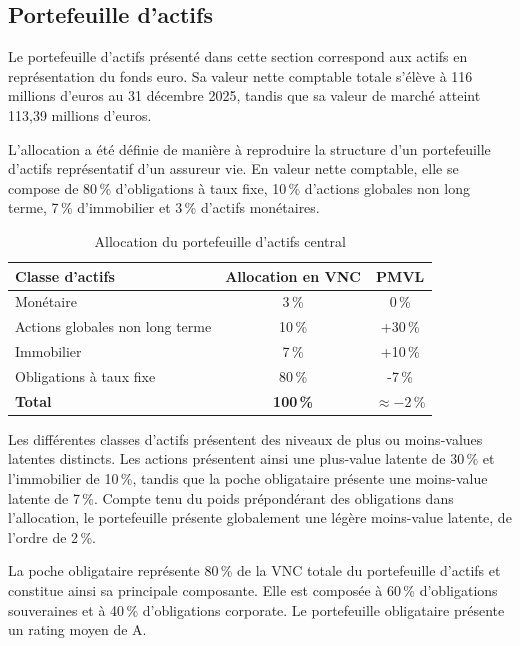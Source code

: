 \subsection{Portefeuille d'actifs}

Le portefeuille d'actifs présenté dans cette section correspond aux actifs en représentation du fonds euro. Sa valeur nette comptable totale s'élève à 116 millions d'euros au 31 décembre 2025, tandis que sa valeur de marché atteint 113,39 millions d'euros.

L'allocation a été définie de manière à reproduire la structure d'un portefeuille d'actifs représentatif d'un assureur vie. En valeur nette comptable, elle se compose de 80\,\% d'obligations à taux fixe, 10\,\% d'actions globales non long terme, 7\,\% d'immobilier et 3\,\% d'actifs monétaires.

\begin{table}[H]
    \centering
    \caption{Allocation du portefeuille d'actifs central}
    \label{tab:allocation_actif_central}
    \begin{tabular}{lcc}
        \hline
        \textbf{Classe d'actifs} & \textbf{Allocation en VNC} & \textbf{PMVL} \\
        \hline
        Monétaire & 3\,\% & 0\,\% \\
        Actions globales non long terme & 10\,\% & +30\,\% \\
        Immobilier & 7\,\% & +10\,\% \\
        Obligations à taux fixe & 80\,\% & -7\,\% \\
        \hline
        \textbf{Total} & \textbf{100\,\%} & \textbf{$\approx -2\,\%$} \\
        \hline
    \end{tabular}
\end{table}

Les différentes classes d'actifs présentent des niveaux de plus ou moins-values latentes distincts. Les actions présentent ainsi une plus-value latente de 30\,\% et l'immobilier de 10\,\%, tandis que la poche obligataire présente une moins-value latente de 7\,\%. Compte tenu du poids prépondérant des obligations dans l'allocation, le portefeuille présente globalement une légère moins-value latente, de l'ordre de 2\,\%.

La poche obligataire représente 80\,\% de la VNC totale du portefeuille d'actifs et constitue ainsi sa principale composante. Elle est composée à 60\,\% d'obligations souveraines et à 40\,\% d'obligations corporate. Le portefeuille obligataire présente un rating moyen de A.


